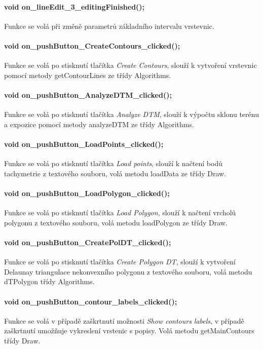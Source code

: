 \documentclass[11pt]{article}
\begin{document}
\paragraph {void on\_lineEdit\_3\_editingFinished();}
Funkce se volá při změně parametrů základního intervalu vrstevnic.

\paragraph {void on\_pushButton\_CreateContours\_clicked();}
Funkce se volá po stisknutí tlačítka \textit{Create Contours}, slouží k vytvoření vrstevnic pomocí metody getContourLines ze třídy Algorithms.


\paragraph {void on\_pushButton\_AnalyzeDTM\_clicked();}
Funkce se volá po stisknutí tlačítka \textit{Analyze DTM}, slouží k výpočtu sklonu terénu a expozice pomocí metody analyzeDTM ze třídy Algorithms.

\paragraph {void on\_pushButton\_LoadPoints\_clicked();}
Funkce se volá po stisknutí tlačítka \textit{Load points}, slouží k načtení bodů tachymetrie z textového souboru, volá metodu loadData ze třídy Draw.

\paragraph {void on\_pushButton\_LoadPolygon\_clicked();}
Funkce se volá po stisknutí tlačítka \textit{Load Polygon}, slouží k načtení vrcholů polygonu z textového souboru, volá metodu loadPolygon ze třídy Draw.

\paragraph {void on\_pushButton\_CreatePolDT\_clicked();}
Funkce se volá po stisknutí tlačítka \textit{Create Polygon DT}, slouží k vytvoření Delaunay triangulace nekonvexního polygonu z textového souboru, volá metodu dTPolygon třídy Algorithms.

\paragraph {void on\_pushButton\_contour\_labels\_clicked();}
Funkce se volá v případě zaškrtnutí možnosti \textit{Show contours labels}, v případě zaškrtnutí umožňuje vykreslení vrstenic s popisy. Volá metodu getMainContours třídy Draw.
\end{document}
